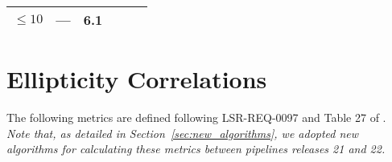 \documentclass[DM, lsstdraft, toc]{lsstdoc}
\begin{document}
\begin{longtable}[]{@{}llllll@{}}
\begin{minipage}[t]{0.14\columnwidth}
\(\leq 10\)\strut
\end{minipage} & \begin{minipage}[t]{0.12\columnwidth}\raggedright\strut
---\strut
\end{minipage} & \begin{minipage}[t]{0.12\columnwidth}\raggedright\strut
6.1\strut
\end{minipage} & \begin{minipage}[t]{0.17\columnwidth}\raggedright\strut
\strut
\end{minipage}\tabularnewline
\bottomrule
\end{longtable}



\section{Ellipticity Correlations}\label{ellipticity-correlations}

The following metrics are defined following LSR-REQ-0097
 and Table 27 of . \textit{Note that, as detailed in Section~\ref{sec:new_algorithms}, we adopted new algorithms for calculating these metrics between pipelines releases 21 and 22.}
\end{document}

